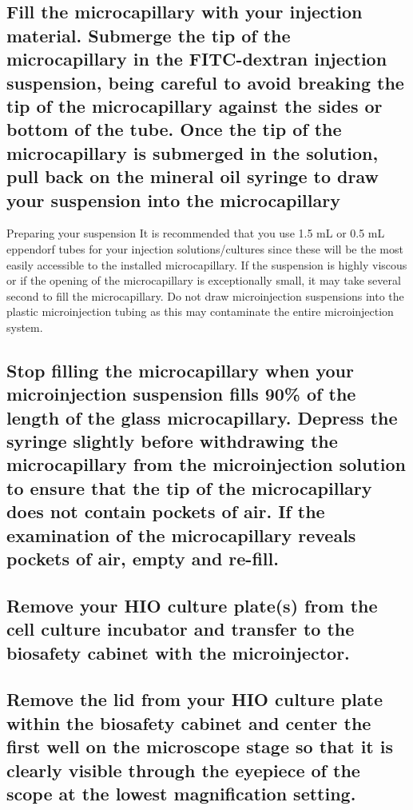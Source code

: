 \documentclass[11pt]{article}
\begin{document}
\subsection{{\sffamily } Fill the microcapillary with your injection material. Submerge the tip of the microcapillary in the FITC-dextran injection suspension, being careful to avoid breaking the tip of the microcapillary against the sides or bottom of the tube. Once the tip of the microcapillary is submerged in the solution, pull back on the mineral oil syringe to draw your suspension into the microcapillary}
\label{sec:orgheadline42}
\begin{bclogo}[logo=\bcinfo, couleurBarre=Black, noborder=true, couleur=gray!10]{     Preparing your suspension}
It is recommended that you use 1.5 mL or 0.5 mL eppendorf tubes for your injection solutions/cultures since these will be the most easily accessible to the installed microcapillary. If the suspension is highly viscous or if the opening of the microcapillary is exceptionally small, it may take several second to fill the microcapillary. Do not draw microinjection suspensions into the plastic microinjection tubing as this may contaminate the entire microinjection system.\\
\end{bclogo}

\subsection{{\sffamily } Stop filling the microcapillary when your microinjection suspension fills 90\% of the length of the glass microcapillary. Depress the syringe slightly before withdrawing the microcapillary from the microinjection solution to ensure that the tip of the microcapillary does not contain pockets of air. If the examination of the microcapillary reveals pockets of air, empty and re-fill.}
\label{sec:orgheadline43}
\subsection{{\sffamily } Remove your HIO culture plate(s) from the cell culture incubator and transfer to the biosafety cabinet with the microinjector.}
\label{sec:orgheadline44}
\subsection{{\sffamily } Remove the lid from your HIO culture plate within the biosafety cabinet and center the first well on the microscope stage so that it is clearly visible through the eyepiece of the scope at the lowest magnification setting.}
\label{sec:orgheadline45}
\end{document}

